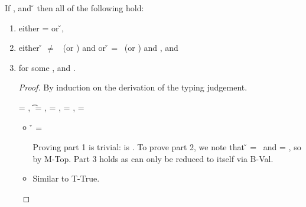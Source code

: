 \begin{lemma}
If \judgement{\propenv{}}{\hastype{\e{}}{\t{}}}{\filterset{\thenprop{\prop{}}}{\elseprop{\prop{}}}}{\object{}},
\satisfies{\openv{}}{\propenv{}} 
and \opsem {\openv{}} {\e{}} {\v{}} 
then all of the following hold:
\begin{enumerate}
  \item either \object{} = \emptyobject{} or \inopenv {\openv{}} {\object{}} {\v{}},
  \item either \v{} $\not=$ \false\ (or \nil) and {\satisfies{\openv{}}{\thenprop{\prop{}}}} or 
               \v{}       = \false\ (or \nil) and {\satisfies{\openv{}}{\elseprop{\prop{}}}}, and
  \item \judgement{}{\hastype{\v{}}{\t{}}}{\filterset{\thenprop{\propp{}}}{\elseprop{\propp{}}}}{\objectp{}}
        for some \thenprop{\propp{}}, \elseprop{\propp{}} and {\objectp{}}.

\begin{proof}
By induction on the derivation of the typing judgement.

\begin{case}[T-True]
\e{} = \true, \t{} = \True, \thenprop{\prop{}} = \topprop{}, \elseprop{\prop{}} = \botprop{}, \object{} = \emptyobject{}

\begin{itemize}
  \item[] 
    \begin{subcase}[B-Val]
      \v{} = \true{}

Proving part 1 is trivial: \object{} is \emptyobject. 
To prove part 2, we note that \v{} = \true\ 
and \thenprop{\prop{}} = \topprop{}, so \satisfies{\openv{}}{\thenprop{\prop{}}} by M-Top.
Part 3 holds as \e{} can only be reduced to itself via B-Val.
\end{subcase}

\end{itemize}

\begin{case}[T-EmptyMap]

  \begin{itemize}
    \item[]
      \begin{subcase}[B-Val]
        Similar to T-True.
      \end{subcase}
  \end{itemize}
\end{case}

\begin{case}[T-Kw]


\end{case}
\end{case}
\end{proof}
\end{enumerate}
\end{lemma}
